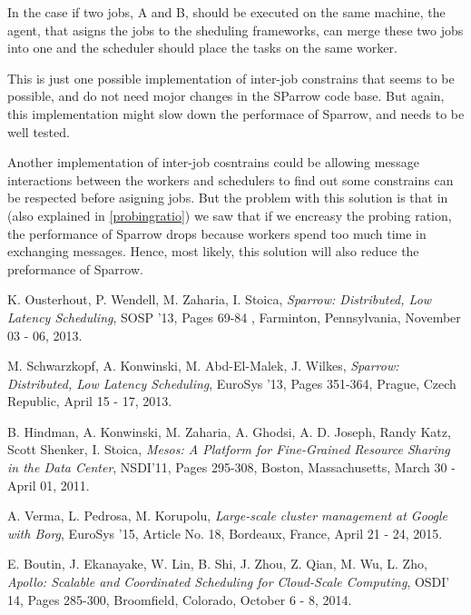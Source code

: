 \documentclass[11pt]{article}
\begin{document}
		In the case if two jobs, A and B, should be executed on the same machine, the agent, that asigns the jobs to the sheduling frameworks, can merge these two jobs into one and the scheduler should place the tasks on the same worker.
		
		This is just one possible implementation of inter-job constrains that seems to be possible, and do not need mojor changes in the SParrow code base. But again, this implementation might slow down the performace of Sparrow, and needs to be well tested.
		
		Another implementation of inter-job cosntrains could be allowing message interactions between the workers and schedulers to find out some constrains can be respected before asigning jobs. But the problem with this solution is that in \cite[subsection 7.9]{sparrow} (also explained in \ref{probingratio}) we saw that if we encreasy the probing ration, the performance of Sparrow drops because workers spend too much time in exchanging messages. Hence, most likely, this solution will also reduce the preformance of Sparrow.
		
			
		




\begin{thebibliography}{9}

  K. Ousterhout, P. Wendell, M. Zaharia, I. Stoica,
  \textit{Sparrow: Distributed, Low Latency Scheduling},
  SOSP '13,
  Pages 69-84 ,
  Farminton, Pennsylvania,
  November 03 - 06,
  2013.

  M. Schwarzkopf, A. Konwinski, M. Abd-El-Malek, J. Wilkes,
  \textit{Sparrow: Distributed, Low Latency Scheduling},
  EuroSys '13,
  Pages 351-364,
  Prague, Czech Republic,
  April 15 - 17,
  2013.
  
  B. Hindman, A. Konwinski, M. Zaharia, A. Ghodsi, A. D. Joseph, Randy Katz, Scott Shenker, I. Stoica,
  \textit{Mesos: A Platform for Fine-Grained Resource Sharing in the Data Center},
  NSDI'11,
  Pages 295-308,
  Boston, Massachusetts,
  March 30 - April 01,
  2011.
  
  A. Verma, L. Pedrosa, M. Korupolu,
  \textit{Large-scale cluster management at Google with Borg},
  EuroSys '15,
  Article No. 18,
  Bordeaux, France,
  April 21 - 24,
  2015.

  E. Boutin, J. Ekanayake, W. Lin, B. Shi, J. Zhou, Z. Qian, M. Wu, L. Zho,
  \textit{Apollo: Scalable and Coordinated Scheduling for Cloud-Scale Computing},
  OSDI' 14,
  Pages 285-300,
  Broomfield, Colorado,
  October 6 - 8,
  2014.

\end{thebibliography}
\end{document}
